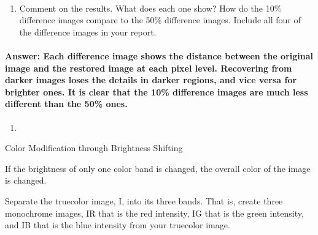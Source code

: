 \documentclass[11pt]{article}
\providecommand{\tightlist}{%
      \setlength{\itemsep}{0pt}\setlength{\parskip}{0pt}}
\begin{document}
    \begin{center}
    \end{center}
    { \hspace*{\fill} \\}
    
    \begin{enumerate}
\def\labelenumi{\arabic{enumi}.}
\setcounter{enumi}{8}
\tightlist
\item
  Comment on the results. What does each one show? How do the 10\%
  difference images compare to the 50\% difference images. Include all
  four of the difference images in your report.
\end{enumerate}

\hypertarget{answer-each-difference-image-shows-the-distance-between-the-original-image-and-the-restored-image-at-each-pixel-level.-recovering-from-darker-images-loses-the-details-in-darker-regions-and-vice-versa-for-brighter-ones.-it-is-clear-that-the-10-difference-images-are-much-less-different-than-the-50-ones.}{%
\paragraph{Answer: Each difference image shows the distance between the
original image and the restored image at each pixel level. Recovering
from darker images loses the details in darker regions, and vice versa
for brighter ones. It is clear that the 10\% difference images are much
less different than the 50\%
ones.}\label{answer-each-difference-image-shows-the-distance-between-the-original-image-and-the-restored-image-at-each-pixel-level.-recovering-from-darker-images-loses-the-details-in-darker-regions-and-vice-versa-for-brighter-ones.-it-is-clear-that-the-10-difference-images-are-much-less-different-than-the-50-ones.}}

    \begin{enumerate}
\def\labelenumi{\arabic{enumi}.}
\setcounter{enumi}{9}
\item
\end{enumerate}

Color Modification through Brightness Shifting

If the brightness of only one color band is changed, the overall color
of the image is changed.

Separate the truecolor image, I, into its three bands. That is, create
three monochrome images, IR that is the red intensity, IG that is the
green intensity, and IB that is the blue intensity from your truecolor
image.
\end{document}
